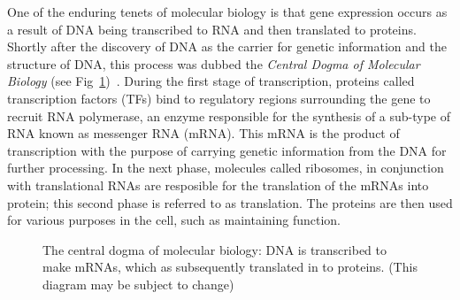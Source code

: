         One of the enduring tenets of molecular biology is that gene expression occurs as a result of DNA being transcribed to RNA and then translated to proteins. Shortly after the discovery of DNA as the carrier for genetic information and the structure of DNA, this process was dubbed the \emph{Central Dogma of Molecular Biology} (see Fig~\ref{fig:centralDogma})~\cite{crick1958protein, macleod1944studies, watson1953structure}. During the first stage of transcription, proteins called transcription factors (TFs) bind to regulatory regions surrounding the gene to recruit RNA polymerase, an enzyme responsible for the synthesis of a sub-type of RNA known as messenger RNA (mRNA). This mRNA is the product of transcription with the purpose of carrying genetic information from the DNA for further processing. In the next phase, molecules called ribosomes, in conjunction with translational RNAs are resposible for the translation of the mRNAs into protein; this second phase is referred to as translation. The proteins are then used for various purposes in the cell, such as maintaining function. %
        
        \begin{figure}
            \centering
            \centering
            \caption{The central dogma of molecular biology: DNA is transcribed to make mRNAs, which as subsequently translated in to proteins. (This diagram may be subject to change)}
            \label{fig:centralDogma}
        \end{figure}
        
